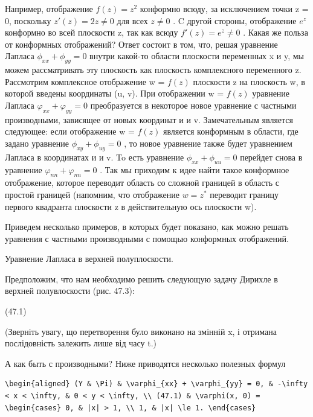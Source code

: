 \documentclass[
  ukrainian,
]{article}
\begin{document}
Например, отображение \(f(z) = z^2\) конформно всюду, за исключением
точки z = 0, поскольку \(z'(z) = 2z \neq 0\) для всех \(z \neq 0\) . C
другой стороны, отображение \(e^z\) конформно во всей плоскости z, так
как всюду \(f'(z) = e^z \neq 0\) . Какая же польза от конформных
отображений? Ответ состоит в том, что, решая уравнение Лапласа
\(\phi_{xx} + \phi_{yy} = 0\) внутри какой-то области плоскости
переменных x и y, мы можем рассматривать эту плоскость как плоскость
комплексного переменного z. Рассмотрим комплексное отображение w =
\(f(z)\) плоскости z на плоскость w, в которой введены координаты (u,
v). При отображении w = \(f(z)\) уравнение Лапласа
\(\varphi_{xx} + \varphi_{yy} = 0\) преобразуется в некоторое новое
уравнение с частными производными, зависящее от новых координат и и v.
Замечательным является следующее: если отображение w = \(f(z)\) является
конформным в области, где задано уравнение \(\phi_{xy} + \phi_{uy} = 0\)
, то новое уравнение также будет уравнением Лапласа в координатах и и v.
To есть уравнение \(\phi_{xx} + \phi_{uu} = 0\) перейдет снова в
уравнение \(\varphi_{nn} + \varphi_{nn} = 0\) . Так мы приходим к идее
найти такое конформное отображение, которое переводит область со сложной
границей в область с простой границей (напомним, что отображение
\(w=z^*\) переводит границу первого квадранта плоскости z в
действительную ось плоскости w).

Приведем несколько примеров, в которых будет показано, как можно решать
уравнения с частными производными с помощью конформных отображений.

Уравнение Лапласа в верхней полуплоскости.

Предположим, что нам необходимо решить следующую задачу Дирихле в
верхней полувлоскости (рис. 47.3):

(47.1)

(Зверніть увагу, що перетворення було виконано на змінній x, і отримана
послідовність залежить лише від часу t.)

А как быть с производными? Ниже приводятся несколько полезных формул

\begin{verbatim}
\begin{aligned} (Y & \Pi) & \varphi_{xx} + \varphi_{yy} = 0, & -\infty < x < \infty, & 0 < y < \infty, \\ (47.1) & \varphi(x, 0) = \begin{cases} 0, & |x| > 1, \\ 1, & |x| \le 1. \end{cases}
\end{verbatim}
\end{document}
